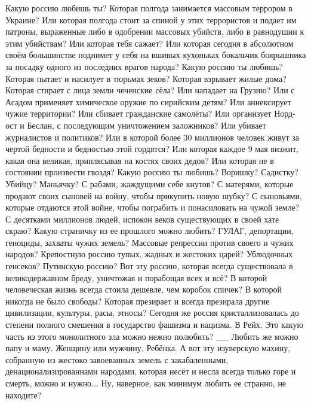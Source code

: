 Какую россию любишь ты?
Которая полгода занимается массовым террором в Украине?
Или которая полгода стоит за спиной у этих террористов и подает им патроны, выраженные либо в одобрении массовых убийств, либо в равнодушии к этим убийствам?
Или которая тебя сажает?
Или которая сегодня в абсолютном своём большинстве поднимет у себя на вшивых кухоньках бокальчик боярышника за посадку одного из последних врагов народа?
Какую россию ты любишь?
Которая пытает и насилует в тюрьмах зеков?
Которая взрывает жилые дома?
Которая стирает с лица земли чеченские сёла?
Или нападает на Грузию?
Или с Асадом применяет химическое оружие по сирийским детям?
Или аннексирует чужие территории?
Или сбивает гражданские самолёты?
Или организует Норд-ост и Беслан, с последующим уничтожением заложников?
Или убивает журналистов и политиков?
Или в которой более 30 миллионов человек живут за чертой бедности и бедностью этой гордятся?
Или которая каждое 9 мая визжит, какая она великая, приплясывая на костях своих дедов?
Или которая не в состоянии произвести гвоздя?
Какую россию ты любишь?
Воришку? Садистку? Убийцу? Маньячку?
С рабами, жаждущими себе кнутов? С матерями, которые продают своих сыновей на войну, чтобы прикупить новую шубку? С сыновьями, которые отдаются этой войне, чтобы пограбить и понасиловать на чужой земле?
С десятками миллионов людей, испокон веков существующих в своей хате скраю?
Какую страничку из ее прошлого можно любить? ГУЛАГ, депортации, геноциды, захваты чужих земель? Массовые репрессии против своего и чужих народов?
Крепостную россию тупых, жадных и жестоких царей?
Ублюдочных генсеков?
Путинскую россию?
Вот эту россию, которая всегда существовала в великодержавном бреду, уничтожая и порабощая всех и всё?
В которой человеческая жизнь всегда стоила дешевле, чем коробок спичек? В которой никогда не было свободы? Которая презирает и всегда презирала другие цивилизации, культуры, расы, этносы?
Сегодня же россия кристаллизовалась до степени полного смешения в государство фашизма и нацизма. В Рейх. Это какую часть из этого монолитного зла можно нежно полюбить?
__
Любить же можно папу и маму. Женщину или мужчину. Ребёнка.
А вот эту изуверскую махину, собранную из жестоко завоеванных земель с закабаленными, денационализированнами народами, которая несёт и несла всегда только горе и смерть, можно и нужно...
Ну, наверное, как минимум любить ее странно, не находите?



